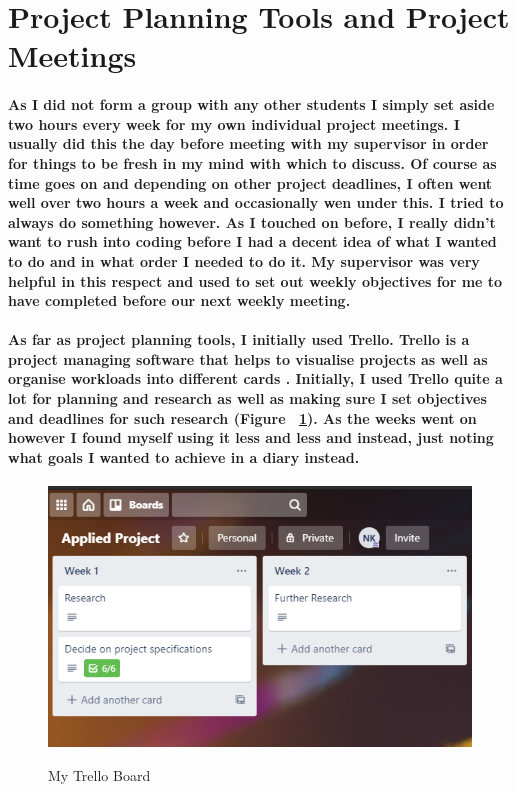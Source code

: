 \section{Project Planning Tools and Project  Meetings}
\paragraph{As I did not form a group with any other students I simply set aside two hours every week for my own individual project meetings. I usually did this the day before meeting with my supervisor in order for things to be fresh in my mind with which to discuss. Of course as time goes on and depending on other project deadlines, I often went well over two hours a week and occasionally wen under this. I tried to always do something however. As I touched on before, I really didn't want to rush into coding before I had a decent idea of what I wanted to do and in what order I needed to do it. My supervisor was very helpful in this respect and used to set out weekly objectives for me to have completed before our next weekly meeting.}
\paragraph{As far as project planning tools, I initially used Trello. Trello is a project managing software that helps to visualise projects as well as organise workloads into different cards \cite{wiki:trello}. Initially, I used Trello quite a lot for planning and research as well as making sure I set objectives and deadlines for such research (Figure ~\ref{trello_label}). As the weeks went on however I found myself using it less and less and instead, just noting what goals I wanted to achieve in a diary instead.}
\begin{figure}
        \centering
        \includegraphics[scale=0.6]{Images/Trello.png} 
        \label{trello_label}
        \caption{My Trello Board}
\end{figure}

